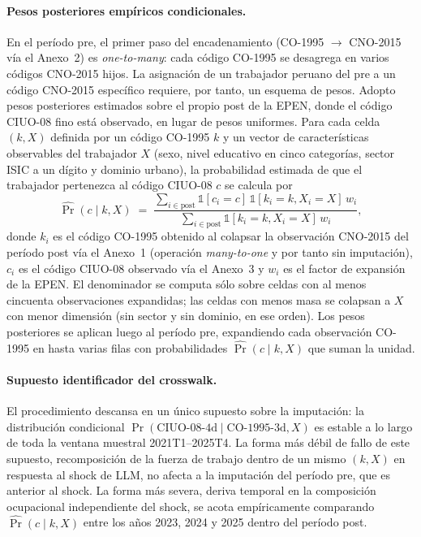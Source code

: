 \paragraph{Pesos posteriores emp\'{i}ricos condicionales.} En el per\'{i}odo pre, el primer paso del encadenamiento (CO-1995 $\to$ CNO-2015 v\'{i}a el Anexo~2) es \emph{one-to-many}: cada c\'{o}digo CO-1995 se desagrega en varios c\'{o}digos CNO-2015 hijos. La asignaci\'{o}n de un trabajador peruano del pre a un c\'{o}digo CNO-2015 espec\'{i}fico requiere, por tanto, un esquema de pesos. Adopto pesos posteriores estimados sobre el propio post de la EPEN, donde el c\'{o}digo CIUO-08 fino est\'{a} observado, en lugar de pesos uniformes. Para cada celda $(k, X)$ definida por un c\'{o}digo CO-1995 $k$ y un vector de caracter\'{i}sticas observables del trabajador $X$ (sexo, nivel educativo en cinco categor\'{i}as, sector ISIC a un d\'{i}gito y dominio urbano), la probabilidad estimada de que el trabajador pertenezca al c\'{o}digo CIUO-08 $c$ se calcula por
\begin{equation}
\widehat{\Pr}(c \mid k, X) \;=\; \frac{\sum_{i \in \text{post}} \mathbb{1}[c_i = c]\,\mathbb{1}[k_i = k, X_i = X]\,w_i}{\sum_{i \in \text{post}} \mathbb{1}[k_i = k, X_i = X]\,w_i},
\label{eq:posterior_weights}
\end{equation}
donde $k_i$ es el c\'{o}digo CO-1995 obtenido al colapsar la observaci\'{o}n CNO-2015 del per\'{i}odo post v\'{i}a el Anexo~1 (operaci\'{o}n \emph{many-to-one} y por tanto sin imputaci\'{o}n), $c_i$ es el c\'{o}digo CIUO-08 observado v\'{i}a el Anexo~3 y $w_i$ es el factor de expansi\'{o}n de la EPEN. El denominador se computa s\'{o}lo sobre celdas con al menos cincuenta observaciones expandidas; las celdas con menos masa se colapsan a $X$ con menor dimensi\'{o}n (sin sector y sin dominio, en ese orden). Los pesos posteriores se aplican luego al per\'{i}odo pre, expandiendo cada observaci\'{o}n CO-1995 en hasta varias filas con probabilidades $\widehat{\Pr}(c \mid k, X)$ que suman la unidad.

\paragraph{Supuesto identificador del crosswalk.} El procedimiento descansa en un \'{u}nico supuesto sobre la imputaci\'{o}n: la distribuci\'{o}n condicional $\Pr(\text{CIUO-08-4d} \mid \text{CO-1995-3d}, X)$ es estable a lo largo de toda la ventana muestral 2021T1--2025T4. La forma m\'{a}s d\'{e}bil de fallo de este supuesto, recomposici\'{o}n de la fuerza de trabajo dentro de un mismo $(k, X)$ en respuesta al shock de LLM, no afecta a la imputaci\'{o}n del per\'{i}odo pre, que es anterior al shock. La forma m\'{a}s severa, deriva temporal en la composici\'{o}n ocupacional independiente del shock, se acota emp\'{i}ricamente comparando $\widehat{\Pr}(c \mid k, X)$ entre los a\~{n}os 2023, 2024 y 2025 dentro del per\'{i}odo post.

